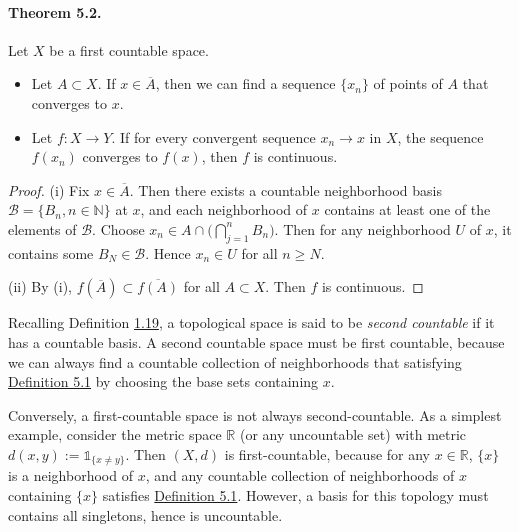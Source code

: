 \documentclass{article}
\numberwithin{equation}{section}
\theoremstyle{plain}
\theoremstyle{definition}
\begin{document}
\paragraph{Theorem 5.2.\label{thm:5.2}} Let $X$ be a first countable space.
\begin{itemize}
	\item[(i)] Let $A\subset X$. If $x\in\overline{A}$, then we can find a sequence $\{x_n\}$ of points of $A$ that converges to $x$.
	\item[(ii)] Let $f:X\to Y$. If for every convergent sequence $x_n\to x$ in $X$, the sequence $f(x_n)$ converges to $f(x)$, then $f$ is continuous.
\end{itemize}
\begin{proof}
(i) Fix $x\in\overline{A}$. Then there exists a countable neighborhood basis $\mathscr{B}=\{B_n,n\in\mathbb{N}\}$ at $x$, and each neighborhood of $x$ contains at least one of the elements of $\mathscr{B}$. Choose $x_n\in A\cap\bigl(\bigcap_{j=1}^n B_n\bigr).$ Then for any neighborhood $U$ of $x$, it contains some $B_N\in\mathscr{B}$. Hence $x_n\in U$ for all $n\geq N$.

(ii) By (i), $f(\overline{A})\subset\overline{f(A)}$ for all $A\subset X$. Then $f$ is continuous.
\end{proof}

Recalling Definition \hyperref[def:1.19]{1.19}, a topological space is said to be \textit{second countable} if it has a countable basis. A second countable space must be first countable, because we can always find a countable collection of neighborhoods that satisfying \hyperref[def:5.1]{Definition 5.1} by choosing the base sets containing $x$.

Conversely, a first-countable space is not always second-countable. As a simplest example, consider the metric space $\mathbb{R}$ (or any uncountable set) with metric $d(x,y):=\mathds{1}_{\{x\neq y\}}$. Then $(X,d)$ is first-countable, because for any $x\in\mathbb{R}$, $\{x\}$ is a neighborhood of $x$, and any countable collection of neighborhoods of $x$ containing $\{x\}$ satisfies \hyperref[def:5.1]{Definition 5.1}. However, a basis for this topology must contains all singletons, hence is uncountable.
\end{document}
